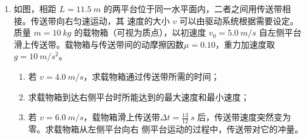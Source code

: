 \begin{enumerate}






\item
如图，相距 $ L=11.5 \ m $ 的两平台位于同一水平面内，二者之间用传送带相接。传送带向右匀速运动，其
速度的大小 $ v $ 可以由驱动系统根据需要设定。质量 $ m=10 \ kg $ 的载物箱（可视为质点），以初速度 $ v_{0} =5.0 \ m/s $ 自左侧平台滑上传送带。载物箱与传送带间的动摩擦因数$ \mu =0.10 $，重力加速度取 $ g=10 \ m/s^{2} $。
\begin{enumerate}
\item
若 $ v=4.0 \ m/s $，求载物箱通过传送带所需的时间；
\item 
求载物箱到达右侧平台时所能达到的最大速度和最小速度；
\item 
若 $ v=6.0 \ m/s $，载物箱滑上传送带$\Delta t=\frac{13}{12} \ s $ 后，传送带速度突然变为零。求载物箱从左侧平台向右
侧平台运动的过程中，传送带对它的冲量。

\end{enumerate}
\begin{figure}[h!]
\flushright

\end{figure}




\end{enumerate}
